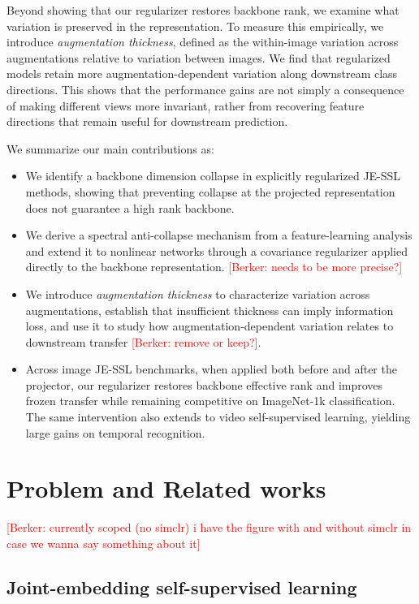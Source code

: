 \documentclass{article} %
\theoremstyle{remark}
\newcommand{\BD}[1]{\textcolor{red}{[Berker: #1]}}
\begin{document}
Beyond showing that our regularizer restores backbone rank, we examine what variation is preserved in the representation. To measure this empirically, we introduce \emph{augmentation thickness}, defined as the within-image variation across augmentations relative to variation between images. We find that regularized models retain more augmentation-dependent variation along downstream class directions. This shows that the performance gains are not simply a consequence of making different views more invariant, rather from recovering feature directions that remain useful for downstream prediction. 


We summarize our main contributions as:

\begin{itemize}[leftmargin=*]
    \item We identify a backbone dimension collapse in explicitly regularized JE-SSL methods, showing that preventing collapse at the projected representation does not guarantee a high rank backbone.
    \item We derive a spectral anti-collapse mechanism from a feature-learning analysis and extend it to nonlinear networks through a covariance regularizer applied directly to the backbone representation. \BD{needs to be more precise?}
    \item We introduce \emph{augmentation thickness} to characterize variation across augmentations, establish that insufficient thickness can imply information loss, and use it to study how augmentation-dependent variation relates to downstream transfer \BD{remove or keep?}.
    \item Across image JE-SSL benchmarks, when applied both before and after the projector, our regularizer restores backbone effective rank and improves frozen transfer while remaining competitive on ImageNet-1k classification. The same intervention also extends to video self-supervised learning, yielding large gains on temporal recognition.
\end{itemize}


\section{Problem and Related works}
\label{sec:related_work}
\BD{currently scoped (no simclr) i have the figure with and without simclr in case we wanna say something about it}

\subsection{Joint-embedding self-supervised learning} %
\label{sec:rel_jepa}
\end{document}
